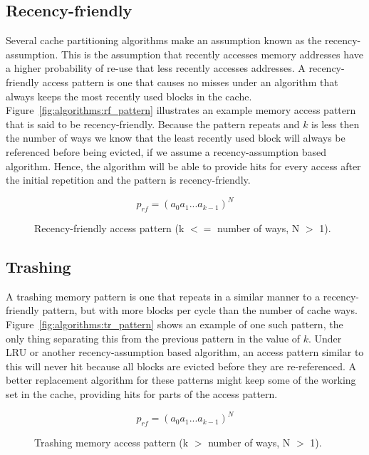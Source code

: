 \subsection{Recency-friendly}
Several cache partitioning algorithms make an assumption known as the recency-assumption.
This is the assumption that recently accesses memory addresses have a higher probability of re-use that less recently accesses addresses.
A recency-friendly access pattern is one that causes no misses under an algorithm that always keeps the most recently used blocks in the cache.
Figure~\ref{fig:algorithms:rf_pattern} illustrates an example memory access pattern that is said to be recency-friendly.
Because the pattern repeats and $k$ is less then the number of ways we know that the least recently used block will always be referenced before being evicted, if we assume a recency-assumption based algorithm.
Hence, the algorithm will be able to provide hits for every access after the initial repetition and the pattern is recency-friendly.

\begin{figure}[ht]
\centering
\begin{equation} \label{fig:algorithms:rf_pattern}
p_{rf} = (a_0 a_1 ... a_{k-1})^N
\end{equation}
\caption{Recency-friendly access pattern (k $<=$ number of ways, N $>$ 1).}
\end{figure}

\subsection{Trashing}
A trashing memory pattern is one that repeats in a similar manner to a recency-friendly pattern, but with more blocks per cycle than the number of cache ways. 
Figure~\ref{fig:algorithms:tr_pattern} shows an example of one such pattern, the only thing separating this from the previous pattern in the value of $k$.
Under LRU or another recency-assumption based algorithm, an access pattern similar to this will never hit because all blocks are evicted before they are re-referenced.
A better replacement algorithm for these patterns might keep some of the working set in the cache, providing hits for parts of the access pattern.
\begin{figure}[ht]
\centering
\begin{equation} \label{fig:algorithms:tr_pattern}
p_{rf} = (a_0 a_1 ... a_{k-1})^N
\end{equation}
\caption{Trashing memory access pattern (k $>$ number of ways, N $>$ 1).}
\end{figure}

